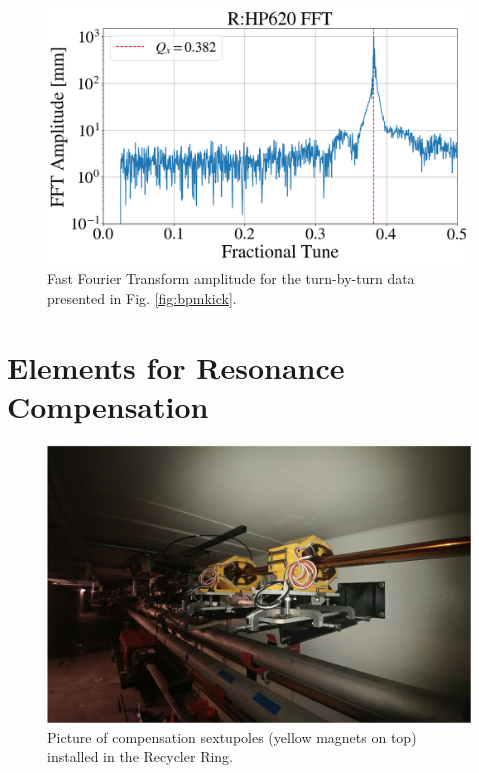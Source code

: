 \begin{figure}[H]
   \centering
   \includegraphics[width=\columnwidth]{chapter3/bpm_fft.png}
   \caption{Fast Fourier Transform amplitude for the turn-by-turn data presented in Fig. \ref{fig:bpmkick}.}
   \label{fig:bpmfft}
\end{figure}

\section{Elements for Resonance Compensation}

\begin{figure}[H]
   \centering
   \includegraphics[width=\columnwidth]{chapter3/sextupoles.png}
   \caption{Picture of compensation sextupoles (yellow magnets on top) installed in the Recycler Ring.}
   \label{fig:sextupoles}
\end{figure}